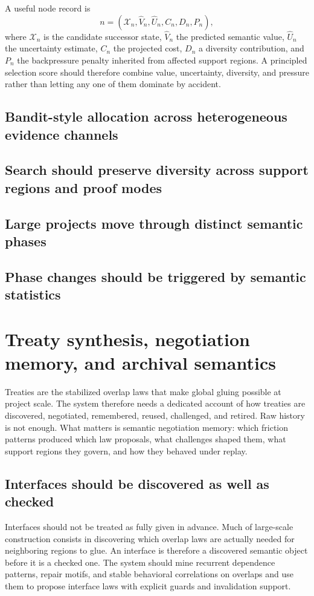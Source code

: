 \documentclass[11pt]{report}
\begin{document}
A useful node record is
\[
n = (\mathcal{X}_n, \hat{V}_n, \hat{U}_n, C_n, D_n, P_n),
\]
where $\mathcal{X}_n$ is the candidate successor state, $\hat{V}_n$ the predicted semantic value, $\hat{U}_n$ the uncertainty estimate, $C_n$ the projected cost, $D_n$ a diversity contribution, and $P_n$ the backpressure penalty inherited from affected support regions. A principled selection score should therefore combine value, uncertainty, diversity, and pressure rather than letting any one of them dominate by accident.
\section{Bandit-style allocation across heterogeneous evidence channels}
\section{Search should preserve diversity across support regions and proof modes}
\section{Large projects move through distinct semantic phases}
\section{Phase changes should be triggered by semantic statistics}
\chapter{Treaty synthesis, negotiation memory, and archival semantics}
Treaties are the stabilized overlap laws that make global gluing possible at project scale. The system therefore needs a dedicated account of how treaties are discovered, negotiated, remembered, reused, challenged, and retired. Raw history is not enough. What matters is semantic negotiation memory: which friction patterns produced which law proposals, what challenges shaped them, what support regions they govern, and how they behaved under replay.

\section{Interfaces should be discovered as well as checked}
Interfaces should not be treated as fully given in advance. Much of large-scale construction consists in discovering which overlap laws are actually needed for neighboring regions to glue. An interface is therefore a discovered semantic object before it is a checked one. The system should mine recurrent dependence patterns, repair motifs, and stable behavioral correlations on overlaps and use them to propose interface laws with explicit guards and invalidation support.
\end{document}
